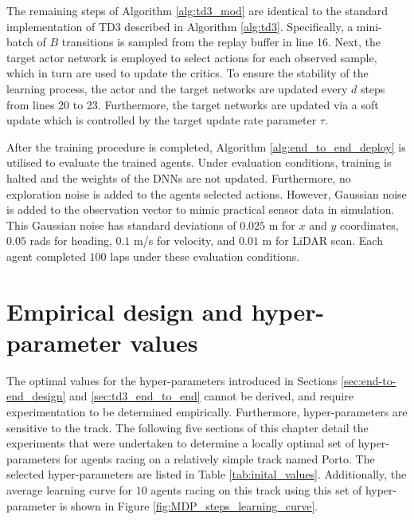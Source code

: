 The remaining steps of Algorithm \ref{alg:td3_mod} are identical to the standard implementation of TD3 described in Algorithm \ref{alg:td3}. 
Specifically, a mini-batch of $B$ transitions is sampled from the replay buffer in line 16.
Next, the target actor network is employed to select actions for each observed sample, which in turn are used to update the critics. 
To ensure the stability of the learning process, the actor and the target networks are updated every $d$ steps from lines 20 to 23. 
Furthermore, the target networks are updated via a soft update which is controlled by the target update rate parameter $\tau$. 



After the training procedure is completed, Algorithm \ref{alg:end_to_end_deploy} is utilised to evaluate the trained agents.
Under evaluation conditions, training is halted and the weights of the DNNs are not updated.
Furthermore, no exploration noise is added to the agents selected actions. 
However, Gaussian noise is added to the observation vector to mimic practical sensor data in simulation. 
This Gaussian noise has standard deviations of $0.025$ m for $x$ and $y$ coordinates, $0.05$ rads for heading, $0.1$ m/s for velocity, and $0.01$ m for LiDAR scan. 
Each agent completed $100$ laps under these evaluation conditions.






\section{Empirical design and hyper-parameter values}\label{sec:ete_empirical_design}

The optimal values for the hyper-parameters introduced in Sections \ref{sec:end-to-end_design} and \ref{sec:td3_end_to_end} cannot be derived, 
and require experimentation to be determined empirically. 
Furthermore, hyper-parameters are sensitive to the track.
The following five sections of this chapter detail the experiments that were undertaken to determine a locally optimal set of hyper-parameters for agents racing on a relatively simple track named Porto.
The selected hyper-parameters are listed in Table \ref{tab:inital_values}.
Additionally, the average learning curve for $10$ agents racing on this track using this set of hyper-parameter is shown in Figure \ref{fig:MDP_steps_learning_curve}.


